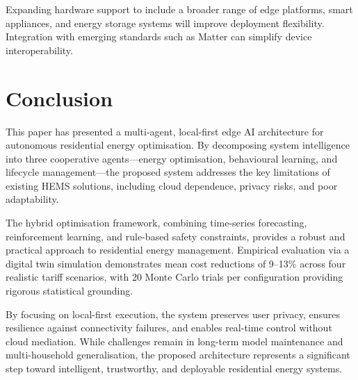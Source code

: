 \documentclass[11pt,a4paper]{article}
\begin{document}
Expanding hardware support to include a broader range of edge platforms, smart appliances, and energy storage systems will improve deployment flexibility. Integration with emerging standards such as Matter can simplify device interoperability.

\section{Conclusion}

This paper has presented a multi-agent, local-first edge AI architecture for autonomous residential energy optimisation. By decomposing system intelligence into three cooperative agents---energy optimisation, behavioural learning, and lifecycle management---the proposed system addresses the key limitations of existing HEMS solutions, including cloud dependence, privacy risks, and poor adaptability.

The hybrid optimisation framework, combining time-series forecasting, reinforcement learning, and rule-based safety constraints, provides a robust and practical approach to residential energy management. Empirical evaluation via a digital twin simulation demonstrates mean cost reductions of 9--13\% across four realistic tariff scenarios, with 20 Monte Carlo trials per configuration providing rigorous statistical grounding.

By focusing on local-first execution, the system preserves user privacy, ensures resilience against connectivity failures, and enables real-time control without cloud mediation. While challenges remain in long-term model maintenance and multi-household generalisation, the proposed architecture represents a significant step toward intelligent, trustworthy, and deployable residential energy systems.
\end{document}
